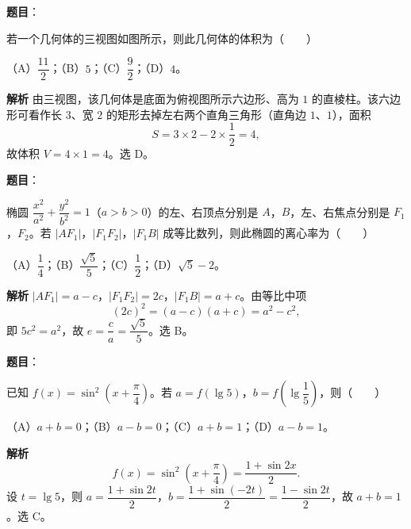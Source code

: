 \begin{answer}

\textbf{题目}：

若一个几何体的三视图如图所示，则此几何体的体积为\mbox{（　　）}
\nopagebreak[4]
\begin{center}\end{center}
\nopagebreak[4]
（A）$\dfrac{11}2$；（B）$5$；（C）$\dfrac92$；（D）$4$。

\textbf{解析}
由三视图，该几何体是底面为俯视图所示六边形、高为 $1$ 的直棱柱。该六边形可看作长 $3$、宽 $2$ 的矩形去掉左右两个直角三角形（直角边 $1$、$1$），面积
\nopagebreak[4]
\[S=3\times2-2\times\frac12=4,\]
故体积 $V=4\times1=4$。选 D。


\end{answer}
\begin{answer}

\textbf{题目}：

椭圆 $\dfrac{x^2}{a^2}+\dfrac{y^2}{b^2}=1$（$a>b>0$）的左、右顶点分别是 $A$，$B$，左、右焦点分别是 $F_1$，$F_2$。若 $|AF_1|$，$|F_1F_2|$，$|F_1B|$ 成等比数列，则此椭圆的离心率为\mbox{（　　）}

（A）$\dfrac14$；（B）$\dfrac{\sqrt5}5$；（C）$\dfrac12$；（D）$\sqrt5-2$。

\textbf{解析}
$|AF_1|=a-c$，$|F_1F_2|=2c$，$|F_1B|=a+c$。由等比中项
\nopagebreak[4]
\[(2c)^2=(a-c)(a+c)=a^2-c^2,\]
即 $5c^2=a^2$，故 $e=\dfrac ca=\dfrac{\sqrt5}5$。选 B。


\end{answer}
\begin{answer}

\textbf{题目}：

已知 $f(x)=\sin^2\left(x+\dfrac\pi4\right)$。若 $a=f(\lg5)$，$b=f\left(\lg\dfrac15\right)$，则\mbox{（　　）}

（A）$a+b=0$；（B）$a-b=0$；（C）$a+b=1$；（D）$a-b=1$。

\textbf{解析}
\nopagebreak[4]
\[f(x)=\sin^2\left(x+\frac\pi4\right)=\frac{1+\sin2x}2.\]
设 $t=\lg5$，则 $a=\dfrac{1+\sin2t}2$，$b=\dfrac{1+\sin(-2t)}2=\dfrac{1-\sin2t}2$，故 $a+b=1$。选 C。


\end{answer}
